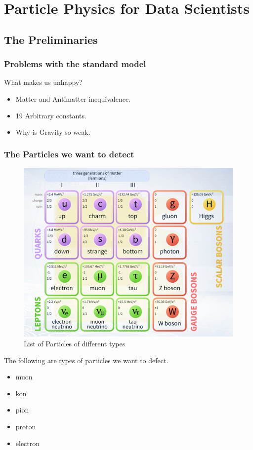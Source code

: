 \chapter{Particle Physics for Data Scientists}



\section{The Preliminaries}


\subsection{Problems with the standard model}

What makes us unhappy?
\begin{itemize}
  \item Matter and Antimatter inequivalence.
  \item 19 Arbitrary constants.
  \item Why is Gravity so weak.
\end{itemize}


\subsection{The Particles we want to detect}

\begin{figure}[H]
  \centering
  \includegraphics[width=0.4\linewidth]{img/hadron/particleid-list.png}
  \caption{List of Particles of different types}
  \label{fig:particleid-list}
\end{figure}

The following are types of particles we want to defect.
\begin{multicols}{3}
  \begin{itemize}
    \item muon
    \item kon
    \item pion
    \item proton
    \item electron
  \end{itemize}
\end{multicols}



